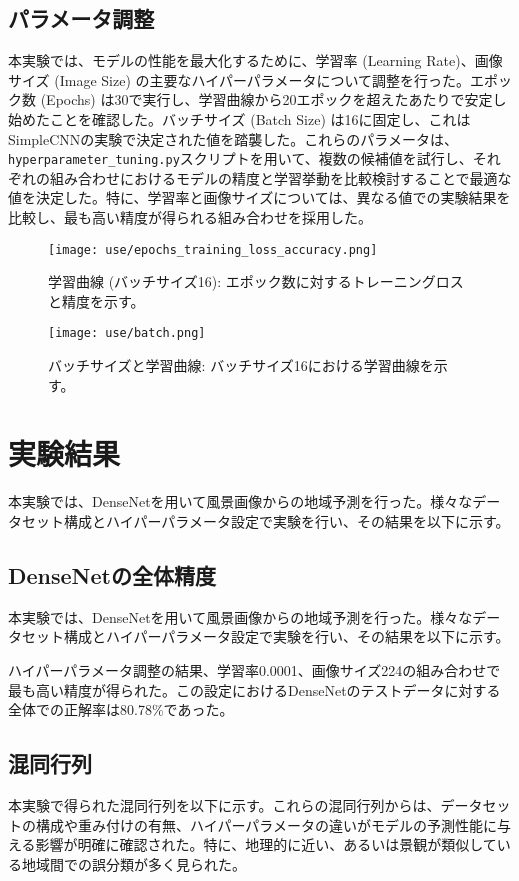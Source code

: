 \documentclass[a4paper, 11pt, titlepage]{jsarticle}
\begin{document}
\subsection{パラメータ調整}
本実験では、モデルの性能を最大化するために、学習率 (Learning Rate)、画像サイズ (Image Size) の主要なハイパーパラメータについて調整を行った。エポック数 (Epochs) は30で実行し、学習曲線から20エポックを超えたあたりで安定し始めたことを確認した。バッチサイズ (Batch Size) は16に固定し、これはSimpleCNNの実験で決定された値を踏襲した。これらのパラメータは、\lstinline{hyperparameter_tuning.py}スクリプトを用いて、複数の候補値を試行し、それぞれの組み合わせにおけるモデルの精度と学習挙動を比較検討することで最適な値を決定した。特に、学習率と画像サイズについては、異なる値での実験結果を比較し、最も高い精度が得られる組み合わせを採用した。

\begin{figure}[H]
  \centering
  \texttt{[image: use/epochs\_training\_loss\_accuracy.png]}
  \caption{学習曲線 (バッチサイズ16): エポック数に対するトレーニングロスと精度を示す。}
  \label{fig:epochs_training_loss_accuracy}
\end{figure}

\begin{figure}[H]
  \centering
  \texttt{[image: use/batch.png]}
  \caption{バッチサイズと学習曲線: バッチサイズ16における学習曲線を示す。}
  \label{fig:batch_size}
\end{figure}


\section{実験結果}
本実験では、DenseNetを用いて風景画像からの地域予測を行った。様々なデータセット構成とハイパーパラメータ設定で実験を行い、その結果を以下に示す。

\subsection{DenseNetの全体精度}
本実験では、DenseNetを用いて風景画像からの地域予測を行った。様々なデータセット構成とハイパーパラメータ設定で実験を行い、その結果を以下に示す。

ハイパーパラメータ調整の結果、学習率0.0001、画像サイズ224の組み合わせで最も高い精度が得られた。この設定におけるDenseNetのテストデータに対する全体での正解率は80.78\%であった。

\subsection{混同行列}
本実験で得られた混同行列を以下に示す。これらの混同行列からは、データセットの構成や重み付けの有無、ハイパーパラメータの違いがモデルの予測性能に与える影響が明確に確認された。特に、地理的に近い、あるいは景観が類似している地域間での誤分類が多く見られた。
\end{document}
